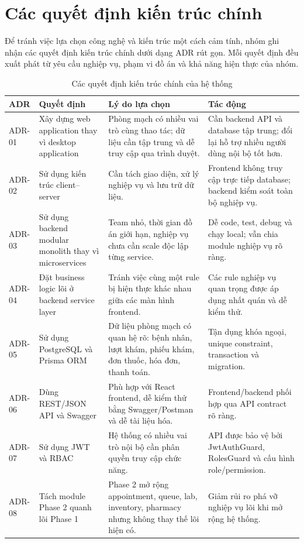 \section{Các quyết định kiến trúc chính}

Để tránh việc lựa chọn công nghệ và kiến trúc một cách cảm tính, nhóm ghi nhận các quyết định kiến trúc chính dưới dạng ADR rút gọn. Mỗi quyết định đều xuất phát từ yêu cầu nghiệp vụ, phạm vi đồ án và khả năng hiện thực của nhóm.

\begin{longtable}{|p{1.6cm}|p{4.4cm}|p{5.1cm}|p{4.2cm}|}
\caption{Các quyết định kiến trúc chính của hệ thống}\\
\hline
\textbf{ADR} & \textbf{Quyết định} & \textbf{Lý do lựa chọn} & \textbf{Tác động} \\
\hline
ADR-01 & Xây dựng web application thay vì desktop application & Phòng mạch có nhiều vai trò cùng thao tác; dữ liệu cần tập trung và dễ truy cập qua trình duyệt. & Cần backend API và database tập trung; đổi lại hỗ trợ nhiều người dùng nội bộ tốt hơn. \\
\hline
ADR-02 & Sử dụng kiến trúc client--server & Cần tách giao diện, xử lý nghiệp vụ và lưu trữ dữ liệu. & Frontend không truy cập trực tiếp database; backend kiểm soát toàn bộ nghiệp vụ. \\
\hline
ADR-03 & Sử dụng backend modular monolith thay vì microservices & Team nhỏ, thời gian đồ án giới hạn, nghiệp vụ chưa cần scale độc lập từng service. & Dễ code, test, debug và chạy local; vẫn chia module nghiệp vụ rõ ràng. \\
\hline
ADR-04 & Đặt business logic lõi ở backend service layer & Tránh việc cùng một rule bị hiện thực khác nhau giữa các màn hình frontend. & Các rule nghiệp vụ quan trọng được áp dụng nhất quán và dễ kiểm thử. \\
\hline
ADR-05 & Sử dụng PostgreSQL và Prisma ORM & Dữ liệu phòng mạch có quan hệ rõ: bệnh nhân, lượt khám, phiếu khám, đơn thuốc, hóa đơn, thanh toán. & Tận dụng khóa ngoại, unique constraint, transaction và migration. \\
\hline
ADR-06 & Dùng REST/JSON API và Swagger & Phù hợp với React frontend, dễ kiểm thử bằng Swagger/Postman và dễ tài liệu hóa. & Frontend/backend phối hợp qua API contract rõ ràng. \\
\hline
ADR-07 & Sử dụng JWT và RBAC & Hệ thống có nhiều vai trò nội bộ cần phân quyền truy cập chức năng. & API được bảo vệ bởi JwtAuthGuard, RolesGuard và cấu hình role/permission. \\
\hline
ADR-08 & Tách module Phase 2 quanh lõi Phase 1 & Phase 2 mở rộng appointment, queue, lab, inventory, pharmacy nhưng không thay thế lõi hiện có. & Giảm rủi ro phá vỡ nghiệp vụ lõi khi mở rộng hệ thống. \\
\hline
\end{longtable}



